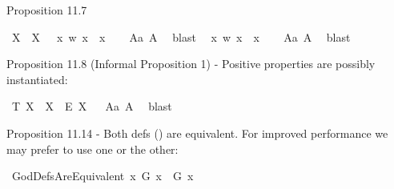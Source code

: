 \begin{isabellebody}
\begin{isamarkuptext}
Proposition 11.7%
\end{isamarkuptext}\isamarkuptrue%
\isamarkupfalse%
\ {\isachardoublequoteopen}{\isasymlfloor}{\isacharparenleft}\isactrlbold {\isasymexists}X{\isachardot}\ {\isasymP}\ X{\isacharparenright}\ \isactrlbold {\isasymrightarrow}\ \isactrlbold {\isasymnot}{\isasymP}\ {\isacharparenleft}{\isacharparenleft}{\isasymlambda}x\ w{\isachardot}\ {\isasymnot}x\ {\isacharequal}\ x{\isacharparenright}{\isacharparenright}{\isasymrfloor}{\isachardoublequoteclose}%
\isadelimproof
\ \ %
\endisadelimproof
%
\isatagproof
{}\isamarkupfalse%
\ A{}a\ A{}\ \isamarkupfalse%
\ blast%
\endisatagproof
{\isafoldproof}%
%
\isadelimproof
%
\endisadelimproof
\isanewline
{}\isamarkupfalse%
\ {\isachardoublequoteopen}{\isasymlfloor}\isactrlbold {\isasymnot}{\isasymP}\ {\isacharparenleft}{\isasymlambda}x\ w{\isachardot}\ {\isasymnot}x\ {\isacharequal}\ x{\isacharparenright}{\isasymrfloor}{\isachardoublequoteclose}%
\isadelimproof
\ \ %
\endisadelimproof
%
\isatagproof
{}\isamarkupfalse%
\ A{}a\ A{}\ \isamarkupfalse%
\ blast%
\endisatagproof
{\isafoldproof}%
%
\isadelimproof
%
\endisadelimproof
%
\begin{isamarkuptext}%
Proposition 11.8 (Informal Proposition 1) - Positive properties are possibly instantiated:%
\end{isamarkuptext}\isamarkuptrue%
\isamarkupfalse%
\ T{}{\isacharcolon}\ {\isachardoublequoteopen}{\isasymlfloor}\isactrlbold {\isasymforall}X{\isachardot}\ {\isasymP}\ X\ \isactrlbold {\isasymrightarrow}\ \isactrlbold {\isasymdiamond}\isactrlbold {\isasymexists}\isactrlsup E\ X{\isasymrfloor}{\isachardoublequoteclose}%
\isadelimproof
\ %
\endisadelimproof
%
\isatagproof
{}\isamarkupfalse%
\ A{}a\ A{}\ \isamarkupfalse%
\ blast%
\endisatagproof
{\isafoldproof}%
%
\isadelimproof
%
\endisadelimproof
%
\begin{isamarkuptext}%
Proposition 11.14 - Both defs () are equivalent. For improved performance we may prefer to use one or the other:%
\end{isamarkuptext}\isamarkuptrue%
\isamarkupfalse%
\ GodDefsAreEquivalent{\isacharcolon}\ {\isachardoublequoteopen}{\isasymlfloor}\isactrlbold {\isasymforall}x{\isachardot}\ G\ x\ \isactrlbold {\isasymleftrightarrow}\ G{\isacharasterisk}\ x{\isasymrfloor}{\isachardoublequoteclose}%

\end{isabellebody}
